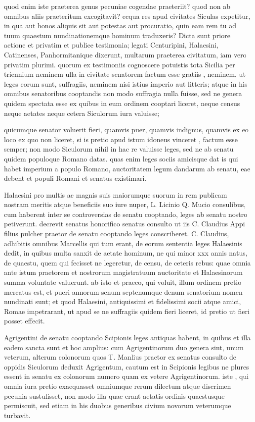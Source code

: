  quod enim iste praeterea genus pecuniae cogendae praeteriit? quod non ab omnibus aliis praeteritum excogitavit? ecqua res apud civitates Siculas expetitur, in qua aut honos aliquis sit aut potestas aut procuratio, quin eam rem tu ad tuum quaestum nundinationemque hominum traduxeris? Dicta sunt priore actione et privatim et publice testimonia; legati Centuripini, Halaesini, Catinenses, Panhormitanique dixerunt, multarum praeterea civitatum, iam vero privatim plurimi. quorum ex testimoniis cognoscere potuistis tota Sicilia per triennium neminem ulla in civitate senatorem factum esse gratiis , neminem, ut leges eorum sunt, suffragiis, neminem nisi istius imperio aut litteris; atque in his omnibus senatoribus cooptandis non modo suffragia nulla fuisse, sed ne genera quidem spectata esse ex quibus in eum ordinem cooptari liceret, neque census neque aetates neque cetera Siculorum iura valuisse;

 quicumque senator voluerit fieri, quamvis puer, quamvis indignus, quamvis ex eo loco ex quo non liceret, si is pretio apud istum idoneus vinceret , factum esse semper; non modo Siculorum nihil in hac re valuisse leges, sed ne ab senatu quidem populoque Romano datas. quas enim leges sociis amicisque dat is qui habet imperium a populo Romano, auctoritatem legum dandarum ab senatu, eae debent et populi Romani et senatus existimari.

 Halaesini pro multis ac magnis suis maiorumque suorum in rem publicam nostram meritis atque beneficiis suo iure nuper, L. Licinio Q. Mucio consulibus, cum haberent inter se controversias de senatu cooptando, leges ab senatu nostro petiverunt. decrevit senatus honorifico senatus consulto ut iis C. Claudius Appi filius pulcher praetor de senatu cooptando leges conscriberet. C. Claudius, adhibitis omnibus Marcellis qui tum erant, de eorum sententia leges Halaesinis dedit, in quibus multa sanxit de aetate hominum, ne qui minor xxx annis natus, de quaestu, quem qui fecisset ne legeretur, de censu, de ceteris rebus: quae omnia ante istum praetorem et nostrorum magistratuum auctoritate et Halaesinorum summa voluntate valuerunt. ab isto et praeco, qui voluit, illum ordinem pretio mercatus est, et pueri annorum senum septenumque denum senatorium nomen nundinati sunt; et quod Halaesini, antiquissimi et fidelissimi socii atque amici, Romae impetrarant, ut apud se ne suffragiis quidem fieri liceret, id pretio ut fieri posset effecit.

 Agrigentini de senatu cooptando Scipionis leges antiquas habent, in quibus et illa eadem sancta sunt et hoc amplius: cum Agrigentinorum duo genera sint, unum veterum, alterum colonorum quos T. Manlius praetor ex senatus consulto de oppidis Siculorum deduxit Agrigentum, cautum est in Scipionis legibus ne plures essent in senatu ex colonorum numero quam ex vetere Agrigentinorum. iste , qui omnia iura pretio exaequasset omniumque rerum dilectum atque discrimen pecunia sustulisset, non modo illa quae erant aetatis ordinis quaestusque permiscuit, sed etiam in his duobus generibus civium novorum veterumque turbavit.

